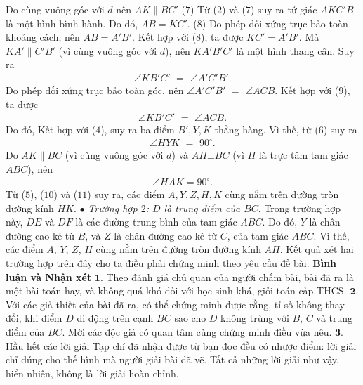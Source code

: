 \begin{multicols}{2}
{	\vskip 0.05cm
	Do cùng vuông góc với $d$ nên $AK \parallel BC'$ \hfill ($7$)
	\vskip 0.05cm
	Từ ($2$) và ($7$) suy ra tứ giác $AKC'B$ là một hình bình hành. Do  đó, $AB = KC'$. \hfill ($8$)
	\vskip 0.05cm
	Do phép đối xứng trục bảo toàn khoảng cách, nên $AB = A'B'$.  Kết hợp với ($8$), ta được $KC' = A'B'$. Mà  $KA' \parallel C'B'$ (vì cùng vuông góc với $d$), nên $KA'B'C'$  là một hình thang cân. Suy ra
	\begin{align*}
		\angle KB'C'\,\, = \,\,\angle A'C'B'. \tag{$9$}
	\end{align*}
	Do phép đối xứng trục bảo toàn góc, nên $\angle A'C'B'\,\, = \,\,\angle ACB.$   Kết hợp với ($9$), ta được
	\begin{align*}
		\angle KB'C'\,\, = \,\,\angle ACB.	
	\end{align*}
	Do đó,  Kết hợp với ($4$), suy ra ba điểm  $B', Y, K$ thẳng hàng. Vì thế, từ ($6$) suy ra
	\begin{align*}
		\angle HYK\,\, = \,\,{90^\circ}. \tag{$10$}
	\end{align*}
	Do $AK \parallel BC$  (vì cùng vuông góc với $d$) và $AH \bot BC$ (vì $H$ là trực tâm tam giác $ABC$), nên
	\begin{align*}
		\angle HAK = 90^\circ. \tag{$11$}
	\end{align*}
	Từ ($5$), ($10$) và ($11$) suy ra, các điểm $A, Y, Z, H, K$ cùng nằm trên đường tròn đường kính $HK$.
	\vskip 0.05cm
	$\bullet$ \textit{Trường hợp $2$: $D$ là trung điểm của $BC$}.
	\vskip 0.05cm
	Trong trường hợp này, $DE$ và $DF$ là các đường trung bình của tam giác $ABC$. Do đó, $Y$ là chân đường cao kẻ từ $B$, và $Z$ là chân đường cao kẻ từ $C$, của tam giác $ABC$. Vì thế, các điểm $A$, $Y$, $Z$, $H$ cùng nằm trên đường tròn đường kính $AH$.
	\vskip 0.05cm
	Kết quả xét hai trường hợp trên đây cho ta điều phải chứng minh theo yêu cầu đề bài.
	\vskip 0.05cm
	\textbf{Bình luận và Nhận xét}
	\vskip 0.05cm
	$\pmb{1.}$ Theo đánh giá chủ quan của người chấm bài, bài đã ra là một bài toán hay, và không quá khó đối với học sinh khá, giỏi toán cấp THCS.
	\vskip 0.05cm
	$\pmb{2.}$ Với các giả thiết của bài đã ra, có thể chứng minh được rằng, tỉ số   không thay đổi, khi điểm $D$ di động trên cạnh $BC$ sao cho $D$ không trùng với $B$, $C$ và trung điểm của $BC$. Mời các độc giả có quan tâm cùng chứng minh điều vừa nêu.
	\vskip 0.05cm
	$\pmb{3.}$ Hầu hết các lời giải Tạp chí đã nhận được từ bạn đọc đều có nhược điểm: lời giải chỉ đúng cho thế hình mà người giải bài đã vẽ. Tất cả những lời giải như vậy, hiển nhiên, không là lời giải hoàn chỉnh.
	\begin{flushright}

\end{flushright}}
\end{multicols}
